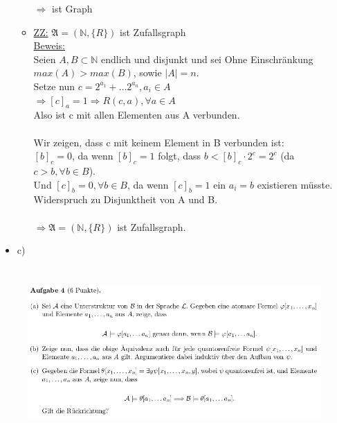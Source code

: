 \documentclass[a4paper]{scrartcl}
\begin{document}
\begin{itemize}
\begin{itemize}
                    $\Rightarrow$  ist Graph
                
                \item \underline{ZZ:} $\mathfrak{A} = (\mathds{N}, \{R\})$ ist Zufallsgraph\\
                    \underline{Beweis:}\\
                    Seien $A,B \subset \mathds{N}$ endlich und disjunkt und sei Ohne Einschränkung $max(A) > max(B)$, sowie $|A| = n$.\\
                    Setze nun $c = 2^{a_1} + \dots 2^{a_n}, a_i \in A$\\
                    $\Rightarrow [c]_a = 1 \Rightarrow R(c,a), \forall a \in A$\\
                    Also ist c mit allen Elementen aus A verbunden.\\
                    \\Wir zeigen, dass c mit keinem Element in B verbunden ist:\\
                    $[b]_c = 0$, da wenn $[b]_c = 1$ folgt, dass $b < [b]_c \cdot 2^c = 2^c$ (da $c > b, \forall b \in B$).\\
                    Und $[c]_b = 0, \forall b \in B$, da wenn $[c]_b = 1$ ein $a_i = b$ existieren müsste. Widerspruch zu Disjunktheit von A und B.\\
                    \\$\Rightarrow \mathfrak{A} = (\mathds{N}, \{R\})$ ist Zufallsgraph.

            \end{itemize}
        \item c)\\

    \end{itemize}

\section*{}%
\label{sec:aufgabe_4}

    \begin{figure}[H]
        \centering
        \includegraphics[scale=0.6]{./A-4.png}
        \label{fig:}
    \end{figure}
\end{document}
